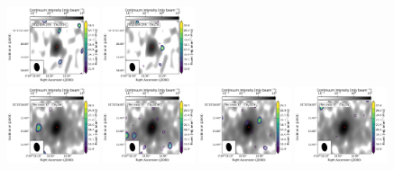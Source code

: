 \begin{figure}[htbp!]
  \includegraphics[width=0.24\textwidth]{./moment0/Set2_ID13_2_CH3OCH3_259311.pdf}
  \includegraphics[width=0.24\textwidth]{./moment0/Set2_ID13_2_CH3CN_257527.pdf}
  \\
  \includegraphics[width=0.24\textwidth]{./moment0/Set2_ID13_CH3OH_243915.pdf}
  \includegraphics[width=0.24\textwidth]{./moment0/Set2_ID13_CH3OCHO_259342.pdf}
  \includegraphics[width=0.24\textwidth]{./moment0/Set2_ID13_CH3OCH3_259311.pdf}
  \includegraphics[width=0.24\textwidth]{./moment0/Set2_ID13_CH3CN_257527.pdf}
  \\
  \caption{}
\end{figure}
\addtocounter{figure}{-1}
